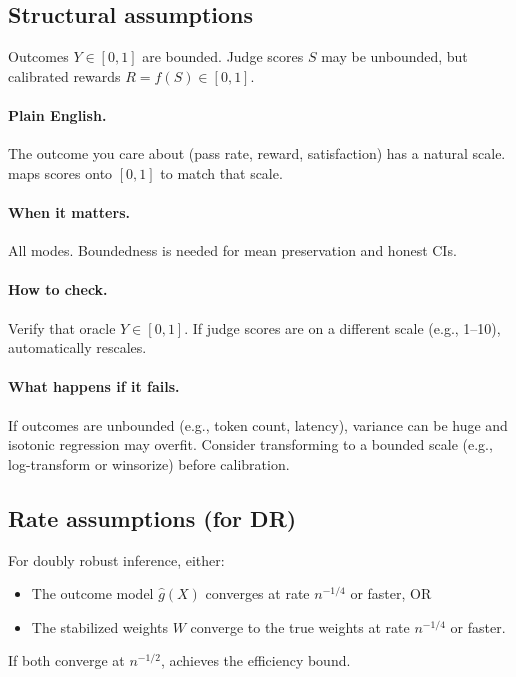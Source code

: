 \subsection{Structural assumptions}

\begin{assumption}
\label{assum:bounded}
Outcomes $Y \in [0, 1]$ are bounded. Judge scores $S$ may be unbounded, but calibrated rewards $R = f(S) \in [0, 1]$.
\end{assumption}

\paragraph{Plain English.} The outcome you care about (pass rate, reward, satisfaction) has a natural scale. \autocal{} maps scores onto $[0, 1]$ to match that scale.

\paragraph{When it matters.} All modes. Boundedness is needed for mean preservation and honest CIs.

\paragraph{How to check.} Verify that oracle $Y \in [0, 1]$. If judge scores are on a different scale (e.g., 1--10), \autocal{} automatically rescales.

\paragraph{What happens if it fails.} If outcomes are unbounded (e.g., token count, latency), variance can be huge and isotonic regression may overfit. Consider transforming to a bounded scale (e.g., log-transform or winsorize) before calibration.

\subsection{Rate assumptions (for DR)}

\begin{assumption}
\label{assum:rates}
For doubly robust inference, either:
\begin{itemize}
\item The outcome model $\hat{g}(X)$ converges at rate $n^{-1/4}$ or faster, OR
\item The stabilized weights $W$ converge to the true weights at rate $n^{-1/4}$ or faster.
\end{itemize}
If both converge at $n^{-1/2}$, \dr{} achieves the efficiency bound.
\end{assumption}


